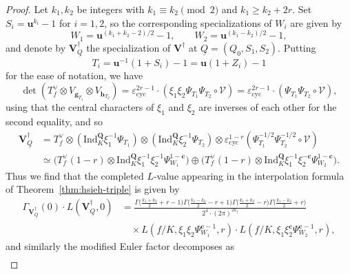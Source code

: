 \documentclass[10pt,letterpaper]{amsart}
\theoremstyle{plain}
\theoremstyle{definition}
\theoremstyle{definition}
\theoremstyle{plain}
\theoremstyle{plain}
\theoremstyle{plain}
\theoremstyle{remark}
\numberwithin{equation}{section}
\newcommand{\cc}{\mathbf{c}}
\newcommand{\ch}{\xi}
\DeclareMathOperator{\BDP}{BDP} %
\newcommand{\VQdag}{{\mathbf{V}_{\underline{Q}}^\dagger}}
\newcommand{\Vdag}{{\mathbf{V}^\dagger}}
\newcommand{\Q}{\mathbf{Q}}
\newcommand{\bff}{{\boldsymbol{f}}}
\newcommand{\bfg}{{\boldsymbol{g}}}
\newcommand{\bfh}{{\boldsymbol{h}}}
\begin{document}
\begin{proof}
Let $k_1, k_2$ be integers with $k_1\equiv k_2\pmod{2}$ and $k_1\geq k_2+2r$. Set $S_i=\mathbf{u}^{k_i}-1$ for $i=1,2$, so the corresponding specializations of $W_i$ are given by 
\[
W_1=\mathbf{u}^{(k_1+k_2-2)/2}-1,\quad\quad W_2=\mathbf{u}^{(k_1-k_2)/2}-1,
\]
and denote by $\VQdag$ the specialization of $\Vdag$ at $\underline{Q}=(Q_0,S_1,S_2)$. 
Putting 
\[
T_i=\mathbf{u}^{-1}(1+S_i)-1=\mathbf{u}(1+Z_i)-1
\]
for the ease of notation, we have 
\[
\det(T_f^{\vee}\otimes V_{\bfg_{T_1}}\otimes V_{\bfh_{T_2}})=\varepsilon_{\mathrm{cyc}}^{2r-1}\cdot(\ch_1\ch_2\Psi_{T_1}\Psi_{T_2}\circ\mathscr{V})=\varepsilon_{\mathrm{cyc}}^{2r-1}\cdot(\Psi_{T_1}\Psi_{T_2}\circ\mathscr{V}),
\]
using that the central characters of $\ch_1$ and $\ch_2$ are inverses of each other for the second equality, and so
\begin{equation}\label{eq:dec-V}
\begin{aligned}
\VQdag&= T_f^{\vee}\otimes({\mathrm{Ind}}_K^\Q\ch_1^{-1}\Psi_{T_1})\otimes({\mathrm{Ind}}_K^\Q\ch_2^{-1}\Psi_{T_2})\otimes\varepsilon_{\mathrm{cyc}}^{1-r}(\Psi_{T_1}^{-1/2}\Psi_{T_2}^{-1/2}\circ\mathscr{V})\\
&\simeq\bigl(T_f^{\vee}(1-r)\otimes{\mathrm{Ind}}_{K}^\Q\ch_1^{-1}\ch_2^{-1}\Psi_{W_1}^{1-\cc}\bigr)\oplus\bigl(T_f^{\vee}(1-r)\otimes{\mathrm{Ind}}_K^\Q\ch_1^{-1}\ch_2^{-\cc}\Psi_{W_2}^{1-\cc}\bigr).
\end{aligned}
\end{equation} 
Thus we find that the completed $L$-value appearing in the interpolation formula of Theorem~\ref{thm:hsieh-triple} is given by
\begin{equation}\label{eq:explicit}
\begin{aligned}
\Gamma_{\VQdag}(0)\cdot L(\VQdag,0)&=\frac{\Gamma\bigl(\frac{k_1+k_2}{2}+r-1\bigr)\Gamma\bigl(\frac{k_1-k_2}{2}-r+1\bigr)\Gamma\bigl(\frac{k_1+k_2}{2}-r\bigr)\Gamma\bigl(\frac{k_1-k_2}{2}+r\bigr)}{2^4\cdot(2\pi)^{2k_1}}\\
&\quad\times L(f/K,\ch_1\ch_2\Psi_{W_1}^{\cc-1},r)\cdot L(f/K,\ch_1\ch_2^\cc\Psi_{W_2}^{\cc-1},r),
\end{aligned}
\end{equation}
and similarly the modified Euler factor decomposes as
\begin{equation}\label{eq:Ep}
\begin{aligned}

\end{aligned}
\end{equation}
\end{proof}
\end{document}
